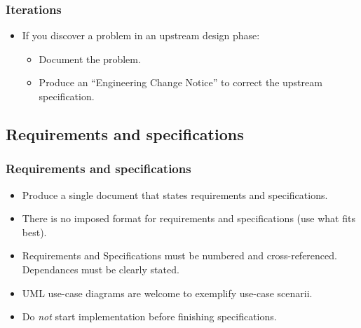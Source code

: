 \documentclass[10pt]{beamer}
\begin{document}
\begin{frame}
  \frametitle{Iterations}
  \begin{itemize}
    \item If you discover a problem in an upstream design phase:
      \begin{itemize}
      \item Document the problem.
      \item Produce an ``Engineering Change Notice'' to correct 
        the upstream specification.
      \end{itemize}
  \end{itemize}
\end{frame}

\subsection{Requirements and specifications}
\begin{frame}
  \frametitle{Requirements and specifications}
  \begin{itemize}
  \item Produce a single document that states requirements and specifications.
  \item There is no imposed format for requirements and specifications (use what
    fits best).
  \item Requirements and Specifications must be numbered and cross-referenced.
    Dependances must be clearly stated.
  \item UML use-case diagrams are welcome to exemplify use-case scenarii.
  \item Do \emph{not} start implementation before finishing specifications.
  \end{itemize}
\end{frame}
\end{document}
